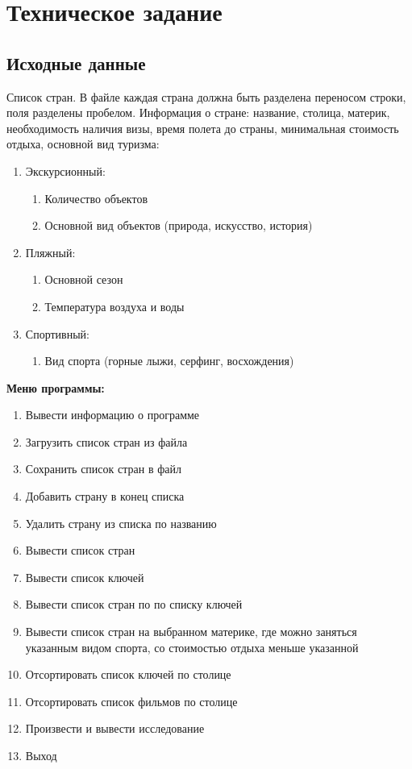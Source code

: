 \section{Техническое задание}
\subsection{Исходные данные}
	Список стран. В файле каждая страна должна быть разделена переносом строки, поля разделены пробелом. Информация о стране: название, столица, материк, необходимость наличия визы, время полета до страны, минимальная стоимость отдыха, основной вид туризма:
	\begin{enumerate}
		\item Экскурсионный: 
		\begin{enumerate}
			\item Количество объектов
			\item Основной вид объектов (природа, искусство, история)
		\end{enumerate}
		\item Пляжный:
		\begin{enumerate}
			\item Основной сезон
			\item Температура воздуха и воды
		\end{enumerate}
		\item Спортивный:
		\begin{enumerate}
			\item Вид спорта (горные лыжи, серфинг, восхождения)
		\end{enumerate}
	\end{enumerate}

\noindent\textbf{Меню программы:}
\begin{enumerate}
	\item Вывести информацию о программе
	\item Загрузить список стран из файла
	\item Сохранить список стран в файл
	\item Добавить страну в конец списка
	\item Удалить страну из списка по названию
	\item Вывести список стран
	\item Вывести список ключей
	\item Вывести список стран по по списку ключей
	\item Вывести список стран на выбранном материке, где можно заняться указанным видом спорта, со стоимостью отдыха меньше указанной
	\item Отсортировать список ключей по столице
	\item Отсортировать список фильмов по столице
	\item Произвести и вывести исследование
	\item Выход
\end{enumerate}


